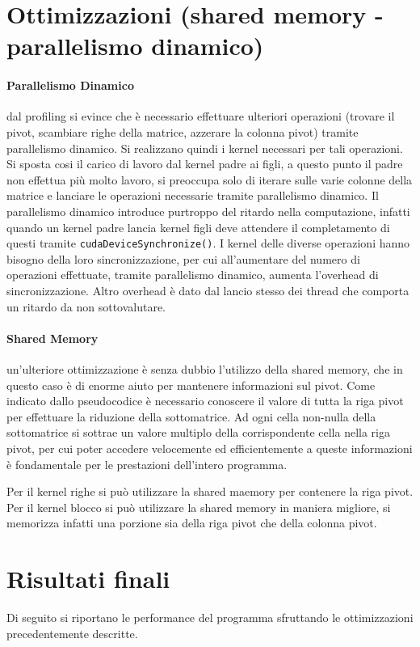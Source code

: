 \documentclass{article}
\begin{document}
\section{Ottimizzazioni (shared memory - parallelismo dinamico)}
\paragraph{Parallelismo Dinamico} dal profiling si evince che è necessario effettuare ulteriori operazioni (trovare il pivot, scambiare righe della matrice, azzerare la colonna pivot) tramite parallelismo dinamico. Si realizzano quindi i kernel necessari per tali operazioni. Si sposta cosi il carico di lavoro dal kernel padre ai figli, a questo punto il padre non effettua più molto lavoro, si preoccupa solo di iterare sulle varie colonne della matrice e lanciare le operazioni necessarie tramite parallelismo dinamico. Il parallelismo dinamico introduce purtroppo del ritardo nella computazione, infatti quando un kernel padre lancia kernel figli deve attendere il completamento di questi tramite \texttt{cudaDeviceSynchronize()}. I kernel delle diverse operazioni hanno bisogno della loro sincronizzazione, per cui all'aumentare del numero di operazioni effettuate, tramite parallelismo dinamico, aumenta l'overhead di sincronizzazione.  Altro overhead è dato dal lancio stesso dei thread che comporta un ritardo da non sottovalutare.

\paragraph{Shared Memory} un'ulteriore ottimizzazione è senza dubbio l'utilizzo della shared memory, che in questo caso è di enorme aiuto per mantenere informazioni sul pivot. Come indicato dallo pseudocodice è necessario conoscere il valore di tutta la riga pivot per effettuare la riduzione della sottomatrice. Ad ogni cella non-nulla della sottomatrice si sottrae un valore multiplo della corrispondente cella nella riga pivot, per cui poter accedere velocemente ed efficientemente a queste informazioni è fondamentale per le prestazioni dell'intero programma.

Per il kernel righe si può utilizzare la shared maemory per contenere la riga pivot. Per il kernel blocco si può utilizzare la shared memory in maniera migliore, si memorizza infatti una porzione sia della riga pivot che della colonna pivot. 

\newpage
\section{Risultati finali}
Di seguito si riportano le performance del programma sfruttando le ottimizzazioni precedentemente descritte.
\end{document}
